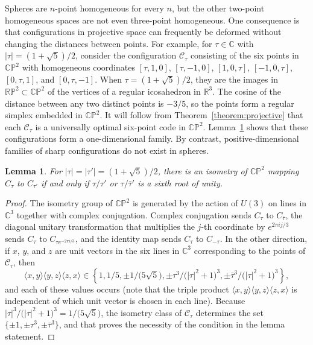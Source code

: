 \documentclass{jams-l}
\theoremstyle{plain}
\newtheorem{lemma}[theorem]{Lemma}
\numberwithin{theorem}{section}
\theoremstyle{definition}
\numberwithin{equation}{section}
\newcommand{\R}{{\mathbb R}}
\newcommand{\C}{{\mathbb C}}
\newcommand{\Proj}{{\mathbb P}}
\begin{document}
Spheres are $n$-point homogeneous for every $n$, but the other
two-point homogeneous spaces are not even three-point homogeneous.
One consequence is that configurations in projective space can
frequently be deformed without changing the distances between
points.  For example, for $\tau \in \C$ with
$|\tau|=(1+\sqrt{5})/2$, consider the configuration
$\mathcal{C}_\tau$ consisting of the six points in $\C\Proj^2$
with homogeneous coordinates $[\tau,1,0]$, $[\tau,-1,0]$,
$[1,0,\tau]$, $[-1,0,\tau]$, $[0,\tau,1]$, and $[0,\tau,-1]$. When
$\tau = (1+\sqrt{5})/2$, they are the images in $\R\Proj^2 \subset
\C\Proj^2 $ of the vertices of a regular icosahedron in $\R^3$.
The cosine of the distance between any two distinct points is
$-3/5$, so the points form a regular simplex embedded in
$\C\Proj^2$.  It will follow from Theorem~\ref{theorem:projective}
that each $\mathcal{C}_\tau$ is a universally optimal six-point
code in $\C\Proj^2$. Lemma~\ref{lemma:equiv} shows that these
configurations form a one-dimensional family.  By contrast,
positive-dimensional families of sharp configurations do not exist
in spheres.

\begin{lemma} \label{lemma:equiv}
For $|\tau|=|\tau'|=(1+\sqrt{5})/2$, there is an isometry of
$\C\Proj^2$ mapping $C_\tau$ to $C_{\tau'}$ if and only if
$\tau/\tau'$ or $\tau/\bar\tau'$ is a sixth root of unity.
\end{lemma}

\begin{proof}
The isometry group of $\C\Proj^2$ is generated by the action of
$U(3)$ on lines in $\C^3$ together with complex conjugation.
Complex conjugation sends $C_\tau$ to $C_{\bar\tau}$, the diagonal
unitary transformation that multiplies the $j$-th coordinate by
$e^{2\pi i j/3}$ sends $C_\tau$ to $C_{\tau e^{-2\pi i/3}}$, and
the identity map sends $C_\tau$ to $C_{-\tau}$.  In the other
direction, if $x$, $y$, and $z$ are unit vectors in the six lines
in $\C^3$ corresponding to the points of $\mathcal{C}_\tau$, then
$$
\langle x,y \rangle \langle y,z \rangle \langle z,x \rangle \in
\left\{1,1/5,\pm 1/\big(5\sqrt{5}\big),
\pm{\tau^3}/{\big(|\tau|^2+1\big)^3},
\pm{\bar\tau^3}/{\big(|\tau|^2+1\big)^3}\right\},
$$
and each of these values occurs (note that the triple product
$\langle x,y \rangle \langle y,z \rangle \langle z,x \rangle$ is
independent of which unit vector is chosen in each line). Because
$|\tau|^3/{\big(|\tau|^2+1\big)^3} = 1/\big(5\sqrt{5}\big)$, the
isometry class of $\mathcal{C}_\tau$ determines the set $\{\pm 1,
\pm\tau^3,\pm \bar\tau^3\}$, and that proves the necessity of the
condition in the lemma statement.
\end{proof}
\end{document}
